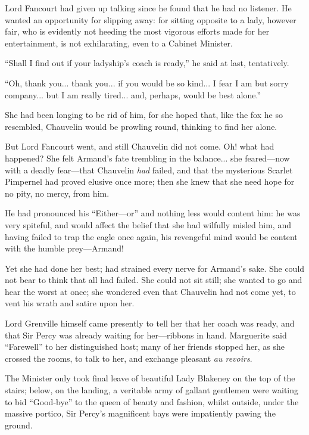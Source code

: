 Lord Fancourt had given up talking since he found that he had no listener. He wanted an opportunity for slipping away: for sitting opposite to a lady, however fair, who is evidently not heeding the most vigorous efforts made for her entertainment, is not exhilarating, even to a Cabinet Minister.

\enquote{Shall I find out if your ladyship's coach is ready,} he said at last, tentatively.

\enquote{Oh, thank you... thank you... if you would be so kind... I fear I am but sorry company... but I am really tired... and, perhaps, would be best alone.}

She had been longing to be rid of him, for she hoped that, like the fox he so resembled, Chauvelin would be prowling round, thinking to find her alone.

But Lord Fancourt went, and still Chauvelin did not come. Oh! what had happened? She felt Armand's fate trembling in the balance... she feared---now with a deadly fear---that Chauvelin \textit{had} failed, and that the mysterious Scarlet Pimpernel had proved elusive once more; then she knew that she need hope for no pity, no mercy, from him.

He had pronounced his \enquote{Either---or\longdash} and nothing less would content him: he was very spiteful, and would affect the belief that she had wilfully misled him, and having failed to trap the eagle once again, his revengeful mind would be content with the humble prey---Armand!

Yet she had done her best; had strained every nerve for Armand's sake. She could not bear to think that all had failed. She could not sit still; she wanted to go and hear the worst at once; she wondered even that Chauvelin had not come yet, to vent his wrath and satire upon her.

Lord Grenville himself came presently to tell her that her coach was ready, and that Sir Percy was already waiting for her---ribbons in hand. Marguerite said \enquote{Farewell} to her distinguished host; many of her friends stopped her, as she crossed the rooms, to talk to her, and exchange pleasant \textit{au revoirs}.

The Minister only took final leave of beautiful Lady Blakeney on the top of the stairs; below, on the landing, a veritable army of gallant gentlemen were waiting to bid \enquote{Good-bye} to the queen of beauty and fashion, whilst outside, under the massive portico, Sir Percy's magnificent bays were impatiently pawing the ground.

